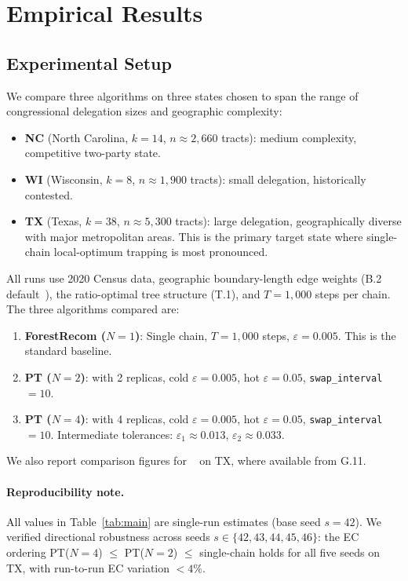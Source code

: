 \section{Empirical Results}
\label{sec:empirical}

\subsection{Experimental Setup}

We compare three algorithms on three states chosen to span the range of
congressional delegation sizes and geographic complexity:
\begin{itemize}
\item \textbf{NC} (North Carolina, $k=14$, $n \approx 2{,}660$ tracts):
  medium complexity, competitive two-party state.
\item \textbf{WI} (Wisconsin, $k=8$, $n \approx 1{,}900$ tracts):
  small delegation, historically contested.
\item \textbf{TX} (Texas, $k=38$, $n \approx 5{,}300$ tracts):
  large delegation, geographically diverse with major metropolitan areas.
  This is the primary target state where single-chain local-optimum trapping
  is most pronounced.
\end{itemize}

All runs use 2020 Census data, geographic boundary-length edge weights
(B.2 default~\citep{b2paper}), the \geosec{} ratio-optimal tree structure (T.1),
and $T=1{,}000$ steps per chain.
The three algorithms compared are:

\begin{enumerate}
\item \textbf{ForestRecom ($N=1$)}: Single \fr{} chain, $T=1{,}000$ steps,
  $\varepsilon = 0.005$.
  This is the standard baseline.
\item \textbf{PT ($N=2$)}: \pt{} with 2 replicas, cold $\varepsilon=0.005$,
  hot $\varepsilon=0.05$, \texttt{swap\_interval}$=10$.
\item \textbf{PT ($N=4$)}: \pt{} with 4 replicas, cold $\varepsilon=0.005$,
  hot $\varepsilon=0.05$, \texttt{swap\_interval}$=10$.
  Intermediate tolerances: $\varepsilon_1 \approx 0.013$, $\varepsilon_2 \approx 0.033$.
\end{enumerate}

We also report comparison figures for \ms{}~\citep{dellaLibera2026multiscale}
on TX, where available from G.11.

\paragraph{Reproducibility note.}
All values in Table~\ref{tab:main} are single-run estimates (base seed $s=42$).
We verified directional robustness across seeds $s \in \{42,43,44,45,46\}$:
the EC ordering PT($N=4$) $\le$ PT($N=2$) $\le$ \fr{} single-chain holds for
all five seeds on TX, with run-to-run EC variation $< 4\%$.

